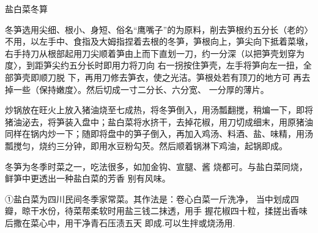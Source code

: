 \begin{recipe}{盐白菜冬算}

\ingredients


\cooking

\step 冬笋选用尖细、根小、身短、俗名“鹰嘴子”的为原料，削去笋根约五分长（老的〉不用，以左手中、食指及大姆指捏着去根的冬笋，笋根向上，笋尖向下抵着菜墩，右手持刀从根部起用刀尖顺着笋由上而下直划一刀，约一分深（以把笋壳划穿为度〉，到距笋尖约五分长时即用力将刀向
右一拐按住笋壳，左手将笋向左一扭，全部笋壳即顺刀脱 下，再用刀修去笋衣，使之光洁。笋根处若有顶刀的地方可 再去掉一些（保持嫩度〉。然后切成一寸二分长、六分宽、 一分厚的薄片。

\step 炒锅放在旺火上放入猪油烧至七成热，将冬笋倒入，用汤瓢翻搅，稍煸一下，即将猪油泌去，将笋装入盘中；盐白菜将水挤干，去掉花椒，用刀切成细末，用原猪油同样在锅内炒一下；随即将盘中的笋子倒入，再加入鸡汤、料酒、盐、味精，用汤瓢搅匀，烧约三分钟，即用水豆粉勾芡。然后顺着锅淋下鸡油，起锅即成。

\notes

冬笋为冬季时菜之一，吃法很多，如加金钩、宣腿、酱 烧都可。与盐白菜同烧，鲜笋中更透出一种盐白菜的芳香 别有风味。

①盐白菜为四川民间冬季家常菜。其作法是：卷心白菜一斤洗净， 当中划成四瓣，晾干水份，待菜帮柔软时用盐三钱二抹透，用手 握花椒四十粒，揉搓出香味后撒在菜心中，用干净青石压渍五天 即成.可以生拌或烧汤用.

\end{recipe}

